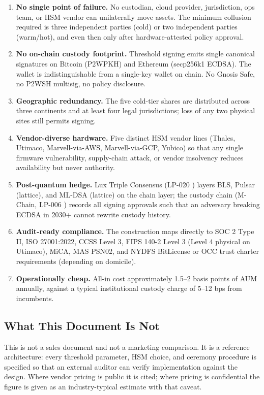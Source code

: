 \begin{enumerate}[nosep]
\item \textbf{No single point of failure.} No custodian, cloud
provider, jurisdiction, ops team, or HSM vendor can unilaterally move
assets. The minimum collusion required is three independent parties
(cold) or two independent parties (warm/hot), and even then only after
hardware-attested policy approval.

\item \textbf{No on-chain custody footprint.} Threshold signing emits
single canonical signatures on Bitcoin (P2WPKH) and Ethereum
(secp256k1 ECDSA). The wallet is indistinguishable from a single-key
wallet on chain. No Gnosis Safe, no P2WSH multisig, no policy
disclosure.

\item \textbf{Geographic redundancy.} The five cold-tier shares are
distributed across three continents and at least four legal
jurisdictions; loss of any two physical sites still permits signing.

\item \textbf{Vendor-diverse hardware.} Five distinct HSM vendor lines
(Thales, Utimaco, Marvell-via-AWS, Marvell-via-GCP, Yubico) so that
any single firmware vulnerability, supply-chain attack, or vendor
insolvency reduces availability but never authority.

\item \textbf{Post-quantum hedge.} Lux Triple Consensus (LP-020
\cite{lp020}) layers BLS, Pulsar (lattice), and ML-DSA (lattice)
on the chain layer; the custody chain (M-Chain, LP-006 \cite{lp006})
records all signing approvals such that an adversary breaking ECDSA
in 2030+ cannot rewrite custody history.

\item \textbf{Audit-ready compliance.} The construction maps directly
to SOC 2 Type II, ISO 27001:2022, CCSS Level 3, FIPS 140-2 Level 3
(Level 4 physical on Utimaco), MiCA, MAS PSN02, and NYDFS BitLicense
or OCC trust charter requirements (depending on domicile).

\item \textbf{Operationally cheap.} All-in cost approximately 1.5--2
basis points of AUM annually, against a typical institutional
custody charge of 5--12 bps from incumbents.
\end{enumerate}

\subsection{What This Document Is Not}

This is not a sales document and not a marketing comparison. It is
a reference architecture: every threshold parameter, HSM choice,
and ceremony procedure is specified so that an external auditor can
verify implementation against the design. Where vendor pricing is
public it is cited; where pricing is confidential the figure is given
as an industry-typical estimate with that caveat.

